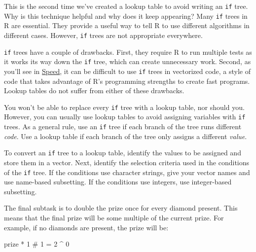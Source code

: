 \documentclass[
  letterpaper,
  DIV=11,
  numbers=noendperiod]{scrbook}
\newenvironment{Shaded}{\begin{snugshade}}{\end{snugshade}}
\newcommand{\CommentTok}[1]{\textcolor[rgb]{0.37,0.37,0.37}{#1}}
\newcommand{\DecValTok}[1]{\textcolor[rgb]{0.68,0.00,0.00}{#1}}
\newcommand{\NormalTok}[1]{\textcolor[rgb]{0.00,0.23,0.31}{#1}}
\newcommand{\SpecialCharTok}[1]{\textcolor[rgb]{0.37,0.37,0.37}{#1}}
\begin{document}
\begin{tcolorbox}[enhanced jigsaw, breakable, colback=white, colbacktitle=quarto-callout-tip-color!10!white, arc=.35mm, bottomrule=.15mm, coltitle=black, left=2mm, rightrule=.15mm, colframe=quarto-callout-tip-color-frame, leftrule=.75mm, opacitybacktitle=0.6, bottomtitle=1mm, toptitle=1mm, titlerule=0mm, opacityback=0, title=\textcolor{quarto-callout-tip-color}{\faLightbulb}\hspace{0.5em}{Lookup Tables Versus if Trees}, toprule=.15mm]

This is the second time we've created a lookup table to avoid writing an
\texttt{if} tree. Why is this technique helpful and why does it keep
appearing? Many \texttt{if} trees in R are essential. They provide a
useful way to tell R to use different algorithms in different cases.
However, \texttt{if} trees are not appropriate everywhere.

\texttt{if} trees have a couple of drawbacks. First, they require R to
run multiple tests as it works its way down the \texttt{if} tree, which
can create unnecessary work. Second, as you'll see in
\hyperref[sec-speed]{Speed}, it can be difficult to use \texttt{if}
trees in vectorized code, a style of code that takes advantage of R's
programming strengths to create fast programs. Lookup tables do not
suffer from either of these drawbacks.

You won't be able to replace every \texttt{if} tree with a lookup table,
nor should you. However, you can usually use lookup tables to avoid
assigning variables with \texttt{if} trees. As a general rule, use an
\texttt{if} tree if each branch of the tree runs different \emph{code}.
Use a lookup table if each branch of the tree only assigns a different
\emph{value}.

To convert an \texttt{if} tree to a lookup table, identify the values to
be assigned and store them in a vector. Next, identify the selection
criteria used in the conditions of the \texttt{if} tree. If the
conditions use character strings, give your vector names and use
name-based subsetting. If the conditions use integers, use integer-based
subsetting.

\end{tcolorbox}

The final subtask is to double the prize once for every diamond present.
This means that the final prize will be some multiple of the current
prize. For example, if no diamonds are present, the prize will be:

\begin{Shaded}
\begin{Highlighting}[]
\NormalTok{prize }\SpecialCharTok{*} \DecValTok{1}      \CommentTok{\# 1 = 2 \^{} 0}
\end{Highlighting}
\end{Shaded}
\end{document}
